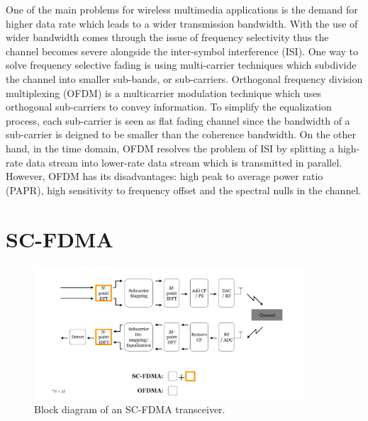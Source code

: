 \documentclass[12pt,a4paper,notitlepage,twoside,headsepline]{scrartcl}
\begin{document}


One of the main problems for wireless multimedia applications is the demand for higher data rate which leads to a wider transmission bandwidth. With the use of wider bandwidth comes through the issue of frequency selectivity thus the channel becomes severe alongside the inter-symbol interference (ISI). One way to solve frequency selective fading is using multi-carrier techniques which subdivide the channel into smaller sub-bands, or sub-carriers. Orthogonal frequency division multiplexing (OFDM) is a multicarrier modulation technique which uses orthogonal sub-carriers to convey information. To simplify the equalization process, each sub-carrier is seen as flat fading channel since the bandwidth of a sub-carrier is deigned to be smaller than the coherence bandwidth. On the other hand, in the time domain, OFDM resolves the problem of ISI by splitting a high-rate data stream into lower-rate data stream which is transmitted in parallel. However, OFDM has its disadvantages: high peak to average power ratio (PAPR), high sensitivity to frequency offset and the spectral nulls in the channel.


\section{SC-FDMA}

\begin{figure}[!ht]
\begin{center}
\includegraphics[width=0.9\textwidth]{figures/fig1}
\end{center}
\caption{Block diagram of an SC-FDMA transceiver.} %
\label{fig:example}
\end{figure}
\end{document}
